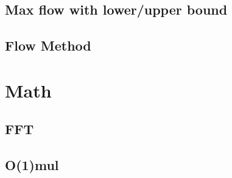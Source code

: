 \documentclass[a4paper,10pt,twocolumn,oneside]{article}
\begin{document}
%

\subsection{Max flow with lower/upper bound}


% 

% 

\newpage
\subsection{Flow Method}


\section{Math}
\subsection{FFT}


%

%

%

\subsection{O(1)mul}

\end{document}
